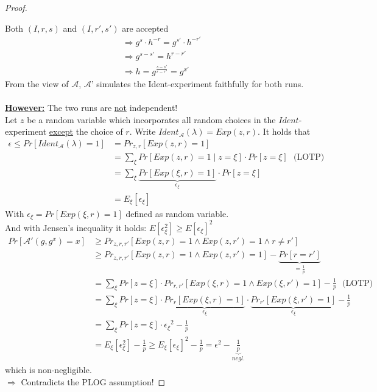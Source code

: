 \begin{proof}
\begin{center}
        \end{center}
        Both $(I,r,s)$ and $(I,r',s')$ are accepted
        \begin{align*}
            [I=g^s \cdot h^{-r} \wedge I=g^{s'} \cdot h^{-r'}] &\Rightarrow g^s \cdot h^{-r} = g^{s'} \cdot h^{-r'}\\
            &\Rightarrow g^{s-s'} = h^{r-r'}\\
            &\Rightarrow h = g^{\frac{s-s'}{r-r'}} = g^{x'}
        \end{align*}
        From the view of $\mathcal{A}$, $\mathcal{A}$' simulates the Ident-experiment faithfully for both runs.\\\\
        \textbf{\underline{However:}} The two runs are \underline{not} independent!\\
        Let $z$ be a random variable which incorporates all random choices in the $Ident$-experiment 
        \underline{except} the choice of $r$.
        Write $Ident_{\mathcal{A}}(\lambda) = Exp(z,r)$.
        It holds that 
        \begin{align*}
            \epsilon \leq Pr[Ident_{\mathcal{A}}(\lambda)=1] &= Pr_{z,r}[Exp(z,r)=1]\\
            &= \sum\limits_{\xi}Pr[Exp(z,r)=1 \mid z=\xi] \cdot Pr[z=\xi]\ \ \ \text{(LOTP)}\\
            &= \sum\limits_{\xi}\underbrace{Pr[Exp(\xi,r)=1]}_{\epsilon_{\xi}} \cdot Pr[z=\xi]\\
            &= E_{\xi}[\epsilon_{\xi}]
        \end{align*}
        With $\epsilon_{\xi} = Pr[Exp(\xi,r)=1]$ defined as random variable.\\
        And with Jensen's inequality it holds: $E[\epsilon^2_{\xi}] \geq E[\epsilon_{\xi}]^2$
        \begin{align*}
            Pr[\mathcal{A}'(g,g^x)=x] &\geq Pr_{z,r,r'}[Exp(z,r)=1 \wedge Exp(z,r')=1 \wedge r \neq r']\\
            &\geq Pr_{z,r,r'}[Exp(z,r)=1 \wedge Exp(z,r')=1] - \underbrace{Pr[r = r']}_{= \frac{1}{p}}\\
            &= \sum\limits_{\xi} Pr[z=\xi] \cdot Pr_{r,r'}[Exp(\xi,r)=1 \wedge Exp(\xi,r')=1] - \frac{1}{p}\ \ \ \text{(LOTP)}\\
            &= \sum\limits_{\xi} Pr[z=\xi] \cdot \underbrace{Pr_{r}[Exp(\xi,r)=1]}_{\epsilon_{\xi}} \cdot \underbrace{Pr_{r'}[Exp(\xi,r')=1]}_{\epsilon_{\xi}} - \frac{1}{p}\\
            &= \sum\limits_{\xi} Pr[z=\xi] \cdot {\epsilon_{\xi}}^2 - \frac{1}{p}\\
            &= E_{\xi}[\epsilon^2_{\xi}] - \frac{1}{p}
            \geq E_{\xi}[\epsilon_{\xi}]^2 - \frac{1}{p} = \epsilon^2 - \underbrace{\frac{1}{p}}_{negl.}
        \end{align*}
        which is non-negligible.\\
        $\Rightarrow$ Contradicts the PLOG assumption!
    \end{proof}

